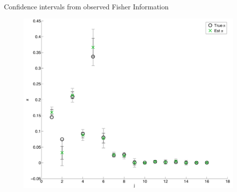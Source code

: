 \documentclass{beamer}
\begin{document}
\begin{frame}{Confidence intervals from observed Fisher Information}
	
	\begin{figure}
			\begin{center}
				\includegraphics[scale=0.3]{5x5eb.pdf}
			\end{center}
	\end{figure}
	
\end{frame}
\end{document}
